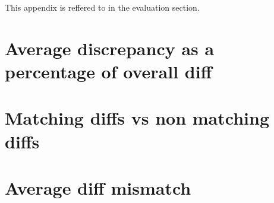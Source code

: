 This appendix is reffered to in the evaluation section.

\section{Average discrepancy as a percentage of overall diff}


\section{Matching diffs vs non matching diffs}


\section{Average diff mismatch}

